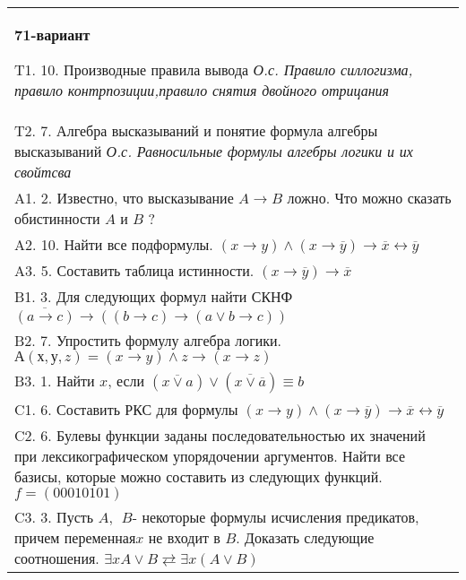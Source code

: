 \documentclass{article}
\begin{document}
\begin{tabular}{m{17cm}}
\textbf{71-вариант}
\newline

T1. 10. Производные правила вывода \emph{О.с. Правило силлогизма, правило контрпозиции,правило снятия двойного отрицания} \\
T2. 7. Алгебра высказываний и понятие формула алгебры высказываний \emph{О.с. Равносильные формулы алгебры логики и их свойтсва} \\
A1. 2. Известно, что высказывание \(A \rightarrow B\) ложно. Что можно сказать обистинности \(A\) и \(B\) ? \\
A2. 10. Найти все подформулы. \((x \rightarrow y) \land (x \rightarrow \overline{y}) \rightarrow \overline{x} \leftrightarrow \overline{y}\) \\
A3. 5. Составить таблица истинности. \((x \rightarrow \overline{y}) \rightarrow \overline{x}\) \\
B1. 3. Для следующих формул найти СКНФ \(\overline{(a \rightarrow c)} \rightarrow \left( (b \rightarrow c) \rightarrow (a \vee b \rightarrow c) \right)\) \\
B2. 7. Упростить формулу алгебра логики. \(А(х,у,z) = (x \rightarrow y) \land z \rightarrow (x \rightarrow z)\) \\
B3. 1. Найти \(x\), если \(\left( \overline{x \vee a} \right) \vee \left( \overline{x \vee \overline{a}} \right) \equiv b\) \\
C1. 6. Составить РКС для формулы \((x \rightarrow y) \land (x \rightarrow \overline{y}) \rightarrow \overline{x} \leftrightarrow \overline{y}\) \\
C2. 6. Булевы функции заданы последовательностью их значений при лексикографическом упорядочении аргументов. Найти все базисы, которые можно составить из следующих функций. \(f = (00010101)\) \\
C3. 3. Пусть \(A,\ \ B\)- некоторые формулы исчисления предикатов, причем переменная\(x\) не входит в \(B\). Доказать следующие соотношения. \(\exists xA \vee B \rightleftarrows \exists x(A \vee B)\) \\

\end{tabular}
\vspace{1cm}
\end{document}
